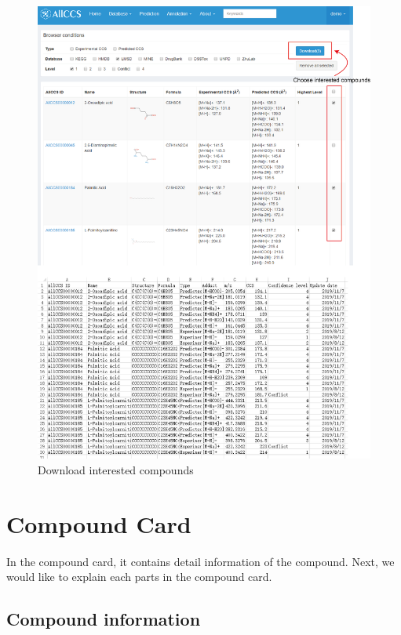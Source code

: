\documentclass[12pt,]{book}
\begin{document}
\begin{figure}

{\centering \includegraphics{images/chapter2/figure2.2browser_download_new} 

}

\caption{Download interested compounds}\label{fig:figure2d2}
\end{figure}

\section{Compound Card}\label{chapter2d2}

In the compound card, it contains detail information of the compound.
Next, we would like to explain each parts in the compound card.

\subsection{Compound information}\label{chapter2d2d1}
\end{document}
